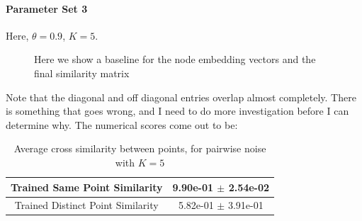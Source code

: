 \documentclass[a4paper]{article}
\begin{document}
\paragraph{Parameter Set 3}
Here, $\theta = 0.9$, $K = 5$.
\begin{figure}[H]
    \centering
    \caption{Here we show a baseline for the node embedding vectors and the final similarity matrix}
    \label{fig:pairwise5_plot}
\end{figure}
Note that the diagonal and off diagonal entries overlap almost completely. There is something that goes wrong, and I need to do more investigation before I can determine why. The numerical scores come out to be:
\begin{table}[H]
    \centering
    \begin{tabular}{|c|c|} \hline
        Trained Same Point Similarity      & 9.90e-01 $\pm$ 2.54e-02  \\ \hline
        Trained Distinct Point Similarity  & 5.82e-01 $\pm$ 3.91e-01  \\ \hline
    \end{tabular}
    \caption{Average cross similarity between points, for pairwise noise with $K=5$}
    \label{tab:pairwise5_table}
\end{table}
\end{document}
